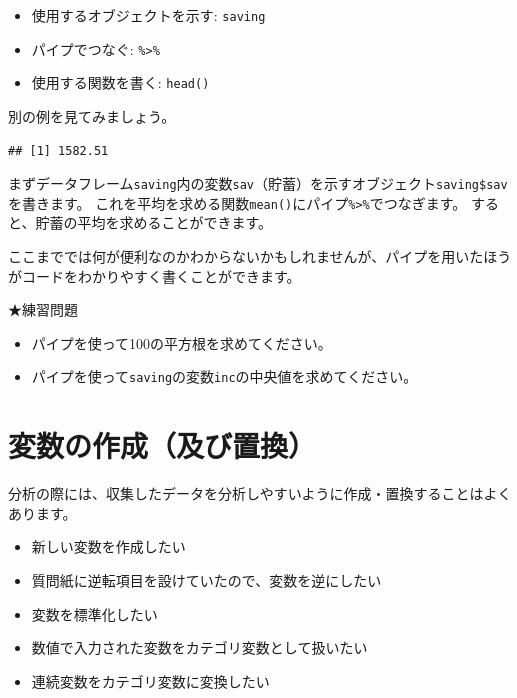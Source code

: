 \documentclass[
]{book}
\newenvironment{Shaded}{\begin{snugshade}}{\end{snugshade}}
\newcommand{\FunctionTok}[1]{\textcolor[rgb]{0.00,0.00,0.00}{#1}}
\newcommand{\NormalTok}[1]{#1}
\newcommand{\SpecialCharTok}[1]{\textcolor[rgb]{0.00,0.00,0.00}{#1}}
\providecommand{\tightlist}{%
  \setlength{\itemsep}{0pt}\setlength{\parskip}{0pt}}
\begin{document}
\begin{itemize}
\tightlist
\item
  使用するオブジェクトを示す: \texttt{saving}
\item
  パイプでつなぐ: \texttt{\%\textgreater{}\%}
\item
  使用する関数を書く: \texttt{head()}
\end{itemize}

別の例を見てみましょう。

\begin{Shaded}
\end{Shaded}

\begin{verbatim}
## [1] 1582.51
\end{verbatim}

まずデータフレーム\texttt{saving}内の変数\texttt{sav}（貯蓄）を示すオブジェクト\texttt{saving\$sav}を書きます。
これを平均を求める関数\texttt{mean()}にパイプ\texttt{\%\textgreater{}\%}でつなぎます。
すると、貯蓄の平均を求めることができます。

ここまででは何が便利なのかわからないかもしれませんが、パイプを用いたほうがコードをわかりやすく書くことができます。

★練習問題

\begin{itemize}
\tightlist
\item
  パイプを使って100の平方根を求めてください。
\item
  パイプを使って\texttt{saving}の変数\texttt{inc}の中央値を求めてください。
\end{itemize}

\hypertarget{ux5909ux6570ux306eux4f5cux6210ux53caux3073ux7f6eux63db}{%
\section{変数の作成（及び置換）}\label{ux5909ux6570ux306eux4f5cux6210ux53caux3073ux7f6eux63db}}

分析の際には、収集したデータを分析しやすいように作成・置換することはよくあります。

\begin{itemize}
\tightlist
\item
  新しい変数を作成したい
\item
  質問紙に逆転項目を設けていたので、変数を逆にしたい
\item
  変数を標準化したい
\item
  数値で入力された変数をカテゴリ変数として扱いたい
\item
  連続変数をカテゴリ変数に変換したい
\end{itemize}
\end{document}
